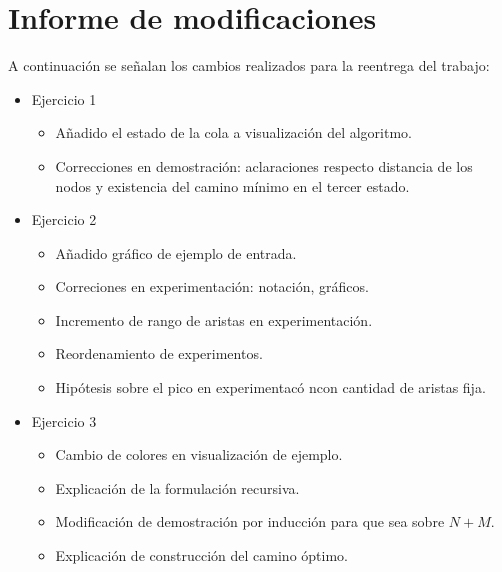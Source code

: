 \section*{Informe de modificaciones}

A continuación se señalan los cambios realizados para la reentrega del trabajo:

\begin{itemize}
	\item{
		Ejercicio 1
		\begin{itemize}
			\item{Añadido el estado de la cola a visualización del algoritmo.}
			\item{Correcciones en demostración: aclaraciones respecto distancia
				de los nodos y existencia del camino mínimo en el tercer estado.}
		\end{itemize}
	}
	\item{
		Ejercicio 2
		\begin{itemize}
			\item{Añadido gráfico de ejemplo de entrada.}
			\item{Correciones en experimentación: notación, gráficos.}
			\item{Incremento de rango de aristas en experimentación.}
			\item{Reordenamiento de experimentos.}
			\item{Hipótesis sobre el pico en experimentacó ncon cantidad de aristas fija.}
		\end{itemize}
	}
	\item{
		Ejercicio 3
		\begin{itemize}
			\item{Cambio de colores en visualización de ejemplo.}
			\item{Explicación de la formulación recursiva.}
			\item{Modificación de demostración por inducción para que sea sobre
				$N + M$.}
			\item{Explicación de construcción del camino óptimo.}
		\end{itemize}
	}
\end{itemize}
